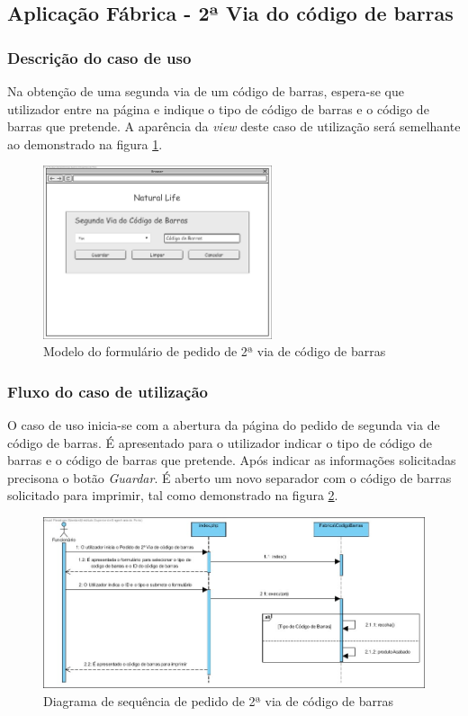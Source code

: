 \subsection{Aplicação Fábrica - 2ª Via do código de barras}
\subsubsection*{Descrição do caso de uso}
Na obtenção de uma segunda via de um código de barras, espera-se que utilizador entre na página e indique o tipo de código de barras e o código de barras que pretende. A aparência da \textit{view} deste caso de utilização será semelhante ao demonstrado na figura \ref{fig:di_2_via}. 

\begin{figure}[H] 
	\begin{center}
		\includegraphics[width=0.60\textwidth,keepaspectratio]{figuras/Diagramas_vp/DI_Fabrica_6_2_Via_Codigo_de_Barras.jpg}
		\caption{Modelo do formulário de pedido de 2ª via de código de barras}
		\label{fig:di_2_via} 
	\end{center}
\end{figure}

\subsubsection*{Fluxo do caso de utilização}
O caso de uso inicia-se com a abertura da página do pedido de segunda via de código de barras. É apresentado para o utilizador indicar o tipo de código de barras e o código de barras que pretende. Após indicar as informações solicitadas precisona o botão \textit{Guardar}. É aberto um novo separador com o código de barras solicitado para imprimir, tal como demonstrado na figura \ref{fig:sd_2_via}.

\begin{figure}[H] 
	\begin{center}
		\includegraphics[width=\textwidth,keepaspectratio]{figuras/Diagramas_vp/SD_Fabrica_6_2_Via_Codigo_de_Barras.jpg}
		\caption{Diagrama de sequência de pedido de 2ª via de código de barras}
		\label{fig:sd_2_via} 
	\end{center}
\end{figure}